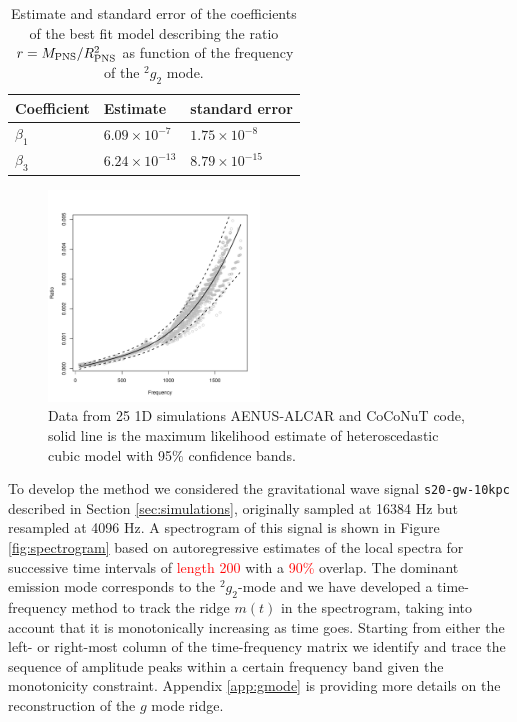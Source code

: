 \begin{table}[h]
  \begin{tabular}{lll}
    \hline
    Coefficient & Estimate & standard error \\
    \hline
    $\beta_1$   & $6.09 \times 10^{-7}$ & $1.75 \times 10^{-8}$ \\
    $\beta_3$   & $6.24 \times 10^{-13}$ & $8.79 \times 10^{-15}$ \\
    \hline
  \end{tabular}
\caption{Estimate and standard error of the coefficients of the best fit model describing the ratio $r=M_{\rm PNS}/R_{\rm PNS}^2$ as function of the frequency of the $\mbox{}^2g_2$ mode.}\label{tab:model}
\end{table}

\begin{figure}
 \centering
 \includegraphics[width=0.5\textwidth,height=0.3\textheight]{plots/model}
 \caption{Data from 25 1D simulations {\sc AENUS-ALCAR } and {\sc CoCoNuT}  code, solid line is the maximum likelihood estimate of heteroscedastic cubic model with 95\% confidence bands.} \label{fig:LMVAR}
\end{figure}

To develop the method we considered the gravitational wave signal
{\tt s20-gw-10kpc} described in Section \ref{sec:simulations}, originally
sampled at 16384 Hz but resampled at 4096 Hz.
A spectrogram of this signal is shown in Figure \ref{fig:spectrogram} based on
autoregressive estimates of the local spectra for successive time intervals of 
\textcolor{red}{length 200} with a \textcolor{red}{ 90\%} overlap.
The dominant emission mode corresponds to the $\mbox{}^2 g_2$-mode and we have
developed a time-frequency method to track the ridge $m(t)$ in the spectrogram,
taking into account that it is monotonically increasing as time goes.
Starting from either the left- or right-most column of the time-frequency matrix
we identify and trace the sequence of amplitude peaks within a certain frequency
band given the monotonicity constraint. Appendix \ref{app:gmode} is providing more
details on the reconstruction of the $g$ mode ridge. 


